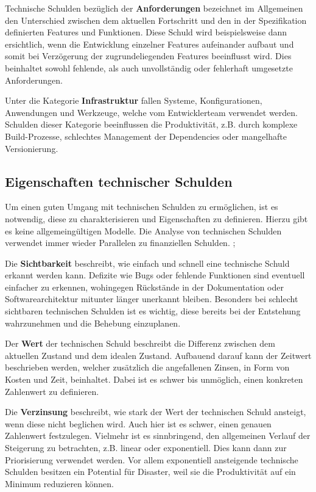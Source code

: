 \documentclass[acmtog]{acmart}
\begin{document}
Technische Schulden bezüglich der \textbf{Anforderungen} bezeichnet im Allgemeinen den
Unterschied zwischen dem aktuellen Fortschritt und den in der Spezifikation
definierten Features und Funktionen. Diese Schuld wird beispielsweise dann
ersichtlich, wenn die Entwicklung einzelner Features aufeinander aufbaut und
somit bei Verzögerung der zugrundeliegenden Features beeinflusst wird. Dies
beinhaltet sowohl fehlende, als auch unvollständig oder fehlerhaft umgesetzte
Anforderungen.

Unter die Kategorie \textbf{Infrastruktur} fallen Systeme, Konfigurationen,
Anwendungen und Werkzeuge, welche vom Entwicklerteam verwendet werden.
Schulden dieser Kategorie beeinflussen die Produktivität, z.B. durch komplexe
Build-Prozesse, schlechtes Management der Dependencies oder mangelhafte
Versionierung.

\subsection{Eigenschaften technischer Schulden}\label{sec:EigenschaftenTS}

Um einen guten Umgang mit technischen Schulden zu ermöglichen, ist es
notwendig, diese zu charakterisieren und Eigenschaften zu definieren. Hierzu
gibt es keine allgemeingültigen Modelle. Die Analyse von technischen Schulden
verwendet immer wieder Parallelen zu finanziellen Schulden. \cite{Brown10}; \cite{Li14}

Die \textbf{Sichtbarkeit} beschreibt, wie einfach und schnell eine technische Schuld
erkannt werden kann. Defizite wie Bugs oder fehlende Funktionen sind eventuell
einfacher zu erkennen, wohingegen Rückstände in der Dokumentation oder
Softwarearchitektur mitunter länger unerkannt bleiben. Besonders bei schlecht
sichtbaren technischen Schulden ist es wichtig, diese bereits bei der
Entstehung wahrzunehmen und die Behebung einzuplanen.

Der \textbf{Wert} der technischen Schuld beschreibt die Differenz zwischen dem
aktuellen Zustand und dem idealen Zustand. Aufbauend darauf kann der Zeitwert
beschrieben werden, welcher zusätzlich die angefallenen Zinsen, in Form von
Kosten und Zeit, beinhaltet. Dabei ist es schwer bis unmöglich, einen
konkreten Zahlenwert zu definieren.

Die \textbf{Verzinsung} beschreibt, wie stark der Wert der technischen Schuld ansteigt,
wenn diese nicht beglichen wird. Auch hier ist es schwer, einen genauen
Zahlenwert festzulegen. Vielmehr ist es sinnbringend, den allgemeinen Verlauf
der Steigerung zu betrachten, z.B. linear oder exponentiell. Dies kann dann
zur Priorisierung verwendet werden. Vor allem exponentiell ansteigende
technische Schulden besitzen ein Potential für Disaster, weil sie die
Produktivität auf ein Minimum reduzieren können.
\end{document}

